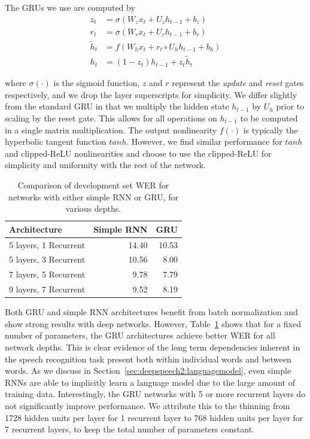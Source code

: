 The GRUs we use are computed by 
\begin{equation*}
\begin{aligned}
z_t &= \sigma(W_z x_t + U_z h_{t-1} + b_z) \\
r_t &= \sigma(W_r x_t + U_r h_{t-1} + b_r) \\
\tilde{h}_t &= f(W_h x_t + r_t \circ U_h h_{t-1} + b_h) \\
h_t &= (1 - z_t) h_{t-1} + z_t \tilde{h}_t
\end{aligned}
\end{equation*}

where $\sigma(\cdot)$ is the sigmoid function, $z$ and $r$ represent the
\emph{update} and \emph{reset} gates respectively, and we drop the layer
superscripts for simplicity. We differ slightly from the standard GRU in that
we multiply the hidden state $h_{t-1}$ by $U_h$ prior to scaling by the reset
gate. This allows for all operations on $h_{t-1}$ to be computed in a single
matrix multiplication. The output nonlinearity $f(\cdot)$ is typically the
hyperbolic tangent function $tanh$. However, we find similar performance for
$tanh$ and clipped-ReLU nonlinearities and choose to use the clipped-ReLU for
simplicity and uniformity with the rest of the network.

\begin{table}
\centering
\begin{tabular}{l  r  r}
\toprule
Architecture &  Simple RNN & GRU \\
\midrule
5 layers, 1 Recurrent   & 14.40 & 10.53  \\
5 layers, 3 Recurrent   & 10.56 & 8.00  \\
7 layers, 5 Recurrent   & 9.78 & 7.79  \\
9 layers, 7 Recurrent   & 9.52 & 8.19  \\
\bottomrule
\end{tabular}
\caption{Comparison of development set WER for networks with either simple RNN
         or GRU, for various depths.}
\label{table:deepspeech2:rnns}
\end{table}

Both GRU and simple RNN architectures benefit from batch normalization and show
strong results with deep networks. However, Table~\ref{table:deepspeech2:rnns}
shows that for a fixed number of parameters, the GRU architectures achieve
better WER for all network depths. This is clear evidence of the long term
dependencies inherent in the speech recognition task present both within
individual words and between words. As we discuss in
Section~\ref{sec:deepspeech2:languagemodel}, even simple RNNs are able to
implicitly learn a language model due to the large amount of training data.
Interestingly, the GRU networks with 5 or more recurrent layers do not
significantly improve performance. We attribute this to the thinning from 1728
hidden units per layer for 1 recurrent layer to 768 hidden units per layer for
7 recurrent layers, to keep the total number of parameters constant.

